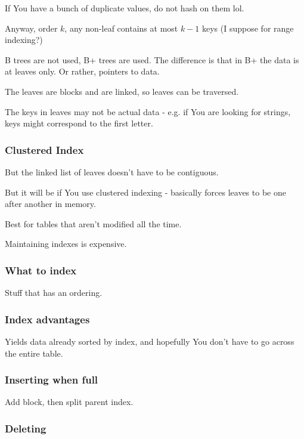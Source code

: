\documentclass{article}
\begin{document}
				If You have a bunch of duplicate values, do not hash on them lol.
				
				Anyway, order $k$, any non-leaf contains at most $k-1$ keys (I suppose for range indexing?)
				
				B trees are not used, B+ trees are used. The difference is that in B+ the data is at leaves only. Or rather, pointers to data.
				
				The leaves are blocks and are linked, so leaves can be traversed.
				
				The keys in leaves may not be actual data - e.g. if You are looking for strings, keys might correspond to the first letter.
				
			\subsubsection{Clustered Index}
			
				But the linked list of leaves doesn't have to be contiguous.
				
				But it will be if You use clustered indexing - basically forces leaves to be one after another in memory.
				
				Best for tables that aren't modified all the time.
				
				Maintaining indexes is expensive.
				
			\subsubsection{What to index}
			
				Stuff that has an ordering.
				
			\subsubsection{Index advantages}
			
				Yields data already sorted by index, and hopefully You don't have to go across the entire table.
				
			\subsubsection{Inserting when full}
			
				Add block, then split parent index.
				
			\subsubsection{Deleting}
				
\end{document}
